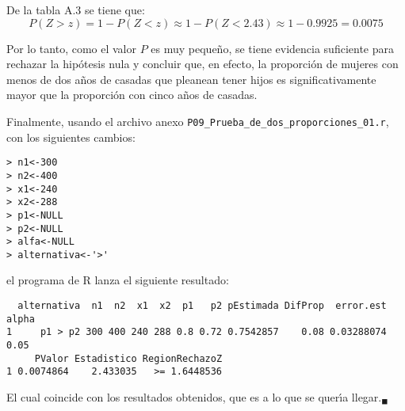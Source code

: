 \begin{solucion}
 \begin{valorp}
  De la tabla A.3 se tiene que:
  \begin{equation*}
   P(Z > z) = 1 - P(Z < z) \approx 1 - P(Z < 2.43) \approx 1 - 0.9925 = 0.0075
  \end{equation*}
 \end{valorp}

 \begin{conclusion}
  Por lo tanto, como el valor $P$ es muy peque\~no,
  se tiene evidencia suficiente para rechazar la hip\'otesis nula
  y concluir que, en efecto, la proporci\'on de mujeres con menos de dos a\~nos
  de casadas que pleanean tener hijos es significativamente mayor
  que la proporci\'on con cinco a\~nos de casadas.
 \end{conclusion}

 Finalmente, usando el archivo anexo \texttt{P09\_Prueba\_de\_dos\_proporciones\_01.r}, con los siguientes cambios:
 \begin{verbatim}
> n1<-300
> n2<-400
> x1<-240
> x2<-288
> p1<-NULL
> p2<-NULL
> alfa<-NULL
> alternativa<-'>'
 \end{verbatim}
 \vspace{-0.5cm}
 el programa de R lanza el siguiente resultado:
 \begin{verbatim}
  alternativa  n1  n2  x1  x2  p1   p2 pEstimada DifProp  error.est alpha
1     p1 > p2 300 400 240 288 0.8 0.72 0.7542857    0.08 0.03288074  0.05
     PValor Estadistico RegionRechazoZ
1 0.0074864    2.433035   >= 1.6448536
 \end{verbatim}
 \vspace{-0.5cm}
 El cual coincide con los resultados obtenidos,
 que es a lo que se quer\'{\i}a llegar.${}_{\blacksquare}$
\end{solucion}
